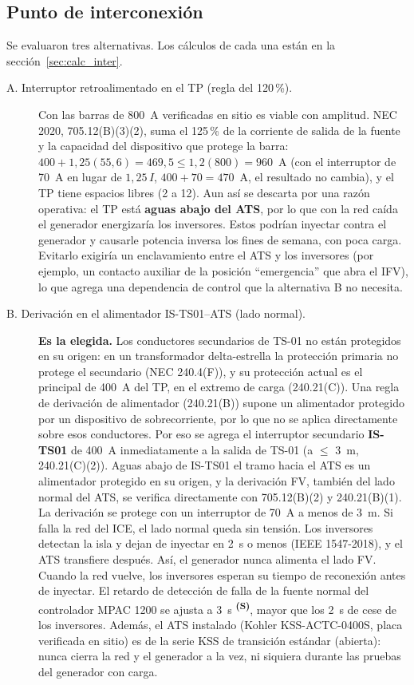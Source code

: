 \documentclass[12pt]{article}
\newcommand{\supuesto}{\textsuperscript{\textcolor{orange!80!black}{\textbf{(S)}}}}
\begin{document}
\subsection{Punto de interconexión}
\label{sec:interconexion}
Se evaluaron tres alternativas. Los cálculos de cada una están en la sección~\ref{sec:calc_inter}.
\begin{description}
\item[A. Interruptor retroalimentado en el TP (regla del 120\,\%).] Con las barras de 800~A verificadas en sitio es viable con amplitud. NEC 2020, 705.12(B)(3)(2), suma el 125\,\% de la corriente de salida de la fuente y la capacidad del dispositivo que protege la barra: $400 + 1{,}25(55{,}6) = 469{,}5 \leq 1{,}2(800)=960$~A (con el interruptor de 70~A en lugar de $1{,}25\,I$, $400+70=470$~A, el resultado no cambia), y el TP tiene espacios libres (2 a 12). Aun así se descarta por una razón operativa: el TP está \textbf{aguas abajo del ATS}, por lo que con la red caída el generador energizaría los inversores. Estos podrían inyectar contra el generador y causarle potencia inversa los fines de semana, con poca carga. Evitarlo exigiría un enclavamiento entre el ATS y los inversores (por ejemplo, un contacto auxiliar de la posición ``emergencia'' que abra el IFV), lo que agrega una dependencia de control que la alternativa B no necesita.
\item[B. Derivación en el alimentador IS-TS01--ATS (lado normal).] \textbf{Es la elegida.} Los conductores secundarios de TS-01 no están protegidos en su origen: en un transformador delta-estrella la protección primaria no protege el secundario (NEC 240.4(F)), y su protección actual es el principal de 400~A del TP, en el extremo de carga (240.21(C)). Una regla de derivación de alimentador (240.21(B)) supone un alimentador protegido por un dispositivo de sobrecorriente, por lo que no se aplica directamente sobre esos conductores. Por eso se agrega el interruptor secundario \textbf{IS-TS01} de 400~A inmediatamente a la salida de TS-01 (a $\leq$ 3~m, 240.21(C)(2)). Aguas abajo de IS-TS01 el tramo hacia el ATS es un alimentador protegido en su origen, y la derivación FV, también del lado normal del ATS, se verifica directamente con 705.12(B)(2) y 240.21(B)(1). La derivación se protege con un interruptor de 70~A a menos de 3~m. Si falla la red del ICE, el lado normal queda sin tensión. Los inversores detectan la isla y dejan de inyectar en 2~s o menos (IEEE 1547-2018), y el ATS transfiere después. Así, el generador nunca alimenta el lado FV. Cuando la red vuelve, los inversores esperan su tiempo de reconexión antes de inyectar. El retardo de detección de falla de la fuente normal del controlador MPAC 1200 se ajusta a 3~s \supuesto{}, mayor que los 2~s de cese de los inversores. Además, el ATS instalado (Kohler KSS-ACTC-0400S, placa verificada en sitio) es de la serie KSS de transición estándar (abierta): nunca cierra la red y el generador a la vez, ni siquiera durante las pruebas del generador con carga.

\end{description}
\end{document}
